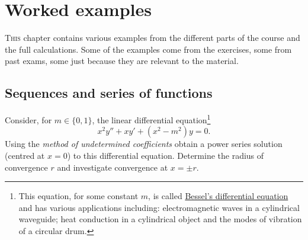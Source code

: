 \chapter{Worked examples}

\lettrine{T}{his} chapter contains various examples from the different parts of the course and the full calculations.
Some of the examples come from the exercises, some from past exams, some just because they are relevant to the material.

\section{Sequences and series of functions}

\begin{task}
    Consider, for $m\in \{0,1\}$, the linear differential equation\footnote{This equation, for some constant $m$, is called \href{https://en.wikipedia.org/wiki/Bessel_function}{Bessel's differential equation} and has various applications including: electromagnetic waves in a cylindrical waveguide; heat conduction in a cylindrical object and the modes of vibration of a circular drum.}
    $$
        x^2y'' + xy' + (x^2-m^2) y = 0.
    $$
    Using the \emph{method of undetermined coefficients} obtain a power series solution (centred at \(x=0\)) to this differential equation.
    Determine the radius of convergence \(r\) and investigate convergence at \(x = \pm r\).
\end{task}

